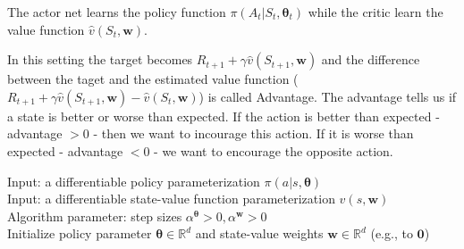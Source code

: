 {

The actor net learns the policy function $\pi(A_t|S_t, \bm{\theta}_t)$ while the critic learn the value function $\hat{v}(S_t, \bm{w})$. 

In this setting the target becomes $R_{t+1}+\gamma\hat{v}(S_{t+1}, \bm{w})$ and the difference between the taget and the estimated value function ($R_{t+1}+\gamma\hat{v}(S_{t+1}, \bm{w})-\hat{v}(S_t, \bm{w})$) is called Advantage.
The advantage tells us if a state is better or worse than expected. If the action is better than expected - advantage $> 0$ - then we want to
incourage this action. If it is worse than expected - advantage $< 0$ - we want to encourage the opposite action.

\begin{tcolorbox}[colback=black!7!white,colframe=black!75!white,title=\textbf{One-step Actor-Critic (episodic), for $\pi_\theta\approx\pi_* $}]
    Input: a differentiable policy parameterization $\pi(a|s,\bm{\theta})$\\
    Input: a differentiable state-value function parameterization $\hat{v}(s,\bm{w})$\\
    Algorithm parameter: step sizes $\alpha^{\bm{\theta}} > 0, \alpha^{\bm{w}} > 0$\\
    Initialize policy parameter $\bm{\theta}\in\mathbb{R}^d$ and state-value weights $\bm{w}\in\mathbb{R}^d$  (e.g., to $\bm{0}$)\\
    

\end{tcolorbox}}
